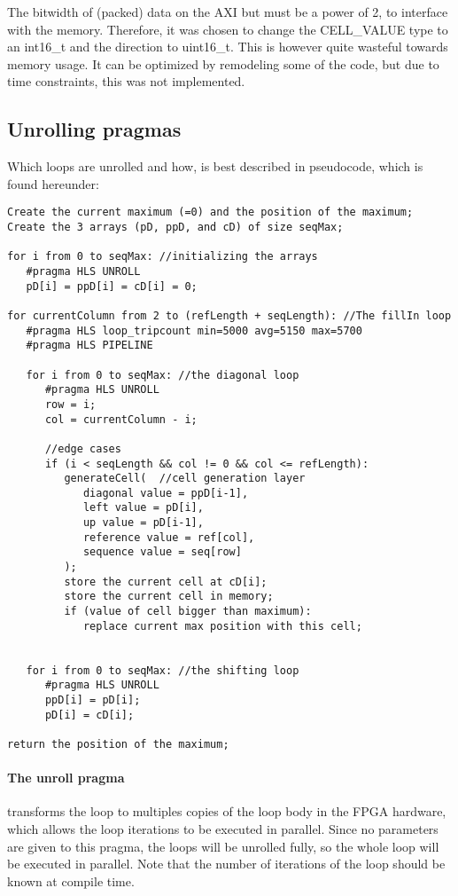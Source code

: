 The bitwidth of (packed) data on the AXI but must be a power of 2, to interface with the memory. Therefore, it was chosen to change the CELL\_VALUE type to an int16\_t and the direction to uint16\_t. This is however quite wasteful towards memory usage. It can be optimized by remodeling some of the code, but due to time constraints, this was not implemented.

\subsection{Unrolling pragmas}
Which loops are unrolled and how, is best described in pseudocode, which is found hereunder:

\begin{lstlisting}
Create the current maximum (=0) and the position of the maximum;
Create the 3 arrays (pD, ppD, and cD) of size seqMax;

for i from 0 to seqMax: //initializing the arrays
   #pragma HLS UNROLL
   pD[i] = ppD[i] = cD[i] = 0;

for currentColumn from 2 to (refLength + seqLength): //The fillIn loop
   #pragma HLS loop_tripcount min=5000 avg=5150 max=5700
   #pragma HLS PIPELINE
	
   for i from 0 to seqMax: //the diagonal loop
      #pragma HLS UNROLL
      row = i;
      col = currentColumn - i;
      
      //edge cases
      if (i < seqLength && col != 0 && col <= refLength):
         generateCell(  //cell generation layer
         	diagonal value = ppD[i-1], 
         	left value = pD[i], 
         	up value = pD[i-1],
         	reference value = ref[col],
         	sequence value = seq[row]
         );
         store the current cell at cD[i];
         store the current cell in memory;
         if (value of cell bigger than maximum):
            replace current max position with this cell;
	
	
   for i from 0 to seqMax: //the shifting loop
      #pragma HLS UNROLL
      ppD[i] = pD[i];
      pD[i] = cD[i];

return the position of the maximum;
\end{lstlisting}

\paragraph{The unroll pragma} transforms the loop to multiples copies of the loop body in the FPGA hardware, which allows the loop iterations to be executed in parallel. Since no parameters are given to this pragma, the loops will be unrolled fully, so the whole loop will be executed in parallel. Note that the number of iterations of the loop should be known at compile time.

